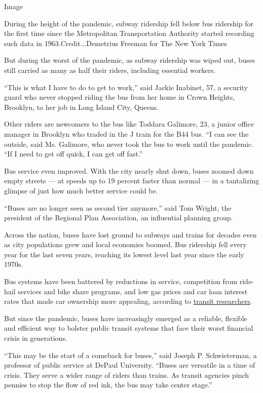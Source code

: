 Image

During the height of the pandemic, subway ridership fell below bus
ridership for the first time since the Metropolitan Transportation
Authority started recording such data in 1963.Credit...Demetrius Freeman
for The New York Times

But during the worst of the pandemic, as subway ridership was wiped out,
buses still carried as many as half their riders, including essential
workers.

``This is what I have to do to get to work,'' said Jackie Inabinet, 57,
a security guard who never stopped riding the bus from her home in Crown
Heights, Brooklyn, to her job in Long Island City, Queens.

Other riders are newcomers to the bus like Toddara Galimore, 23, a
junior office manager in Brooklyn who traded in the J train for the B44
bus. ``I can see the outside, said Ms. Galimore, who never took the bus
to work until the pandemic. ``If I need to get off quick, I can get off
fast.''

Bus service even improved. With the city nearly shut down, buses zoomed
down empty streets --- at speeds up to 19 percent faster than normal ---
in a tantalizing glimpse of just how much better service could be.

``Buses are no longer seen as second tier anymore,'' said Tom Wright,
the president of the Regional Plan Association, an influential planning
group.

Across the nation, buses have lost ground to subways and trains for
decades even as city populations grew and local economies boomed. Bus
ridership fell every year for the last seven years, reaching its lowest
level last year since the early 1970s.

Bus systems have been battered by reductions in service, competition
from ride-hail services and bike share programs, and low gas prices and
car loan interest rates that made car ownership more appealing,
according to
\href{https://www.nytimes3xbfgragh.onion/interactive/2020/03/13/upshot/mystery-of-missing-bus-riders.html}{transit
researchers}.

But since the pandemic, buses have increasingly emerged as a reliable,
flexible and efficient way to bolster public transit systems that face
their worst financial crisis in generations.

``This may be the start of a comeback for buses,'' said Joseph P.
Schwieterman, a professor of public service at DePaul University.
``Buses are versatile in a time of crisis. They serve a wider range of
riders than trains. As transit agencies pinch pennies to stop the flow
of red ink, the bus may take center stage.''

